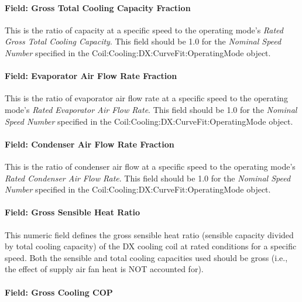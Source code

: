 \paragraph{Field: Gross Total Cooling Capacity Fraction}\label{field-gross-total-cooling-capacity-fraction}

This is the ratio of capacity at a specific speed to the operating mode's \textit{Rated Gross Total Cooling Capacity}. This field should be 1.0 for the \textit{Nominal Speed Number} specified in the Coil:Cooling:DX:CurveFit:OperatingMode object.

\paragraph{Field: Evaporator Air Flow Rate Fraction}\label{field-evaporator-air-flow-rate-fraction}

This is the ratio of evaporator air flow rate at a specific speed to the operating mode's \textit{Rated Evaporator Air Flow Rate}. This field should be 1.0 for the \textit{Nominal Speed Number} specified in the Coil:Cooling:DX:CurveFit:OperatingMode object.

\paragraph{Field: Condenser Air Flow Rate Fraction}\label{field-condenser-air-flow-rate-fraction}

This is the ratio of condenser air flow at a specific speed to the operating mode's \textit{Rated Condenser Air Flow Rate}. This field should be 1.0 for the \textit{Nominal Speed Number} specified in the Coil:Cooling:DX:CurveFit:OperatingMode object.

\paragraph{Field: Gross Sensible Heat Ratio}\label{field-gross-sensible-heat-ratio}

This numeric field defines the gross sensible heat ratio (sensible capacity divided by total cooling capacity) of the DX cooling coil at rated conditions for a specific speed. Both the sensible and total cooling capacities used should be gross (i.e., the effect of supply air fan heat is NOT accounted for).

\paragraph{Field: Gross Cooling COP}\label{field-gross-rated-cooling-cop}

